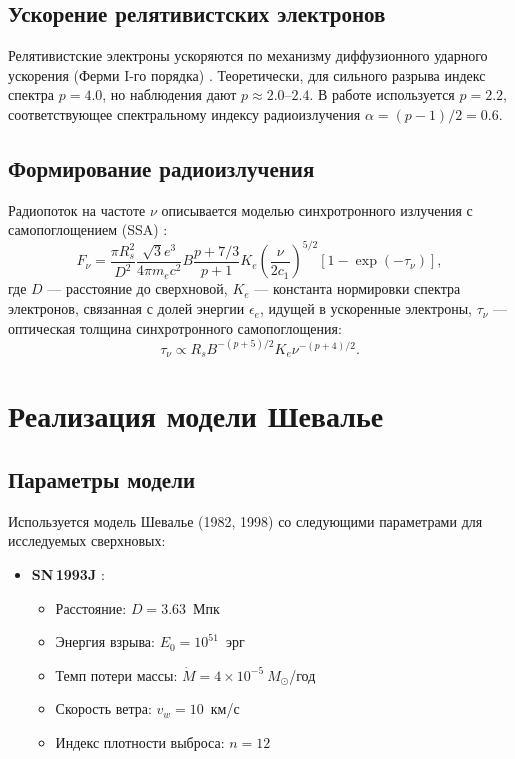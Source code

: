 \documentclass[a4paper,12pt]{extarticle}
\newcommand{\rs}{R_s}
\begin{document}
\subsection{Ускорение релятивистских электронов}

Релятивистские электроны ускоряются по механизму диффузионного ударного ускорения (Ферми I-го порядка) \cite{blandford1978}. Теоретически, для сильного разрыва индекс спектра $p = 4.0$, но наблюдения дают $p \approx 2.0$–$2.4$. В работе используется $p = 2.2$, соответствующее спектральному индексу радиоизлучения $\alpha = (p-1)/2 = 0.6$.

\subsection{Формирование радиоизлучения}

Радиопоток на частоте $\nu$ описывается моделью синхротронного излучения с самопоглощением (SSA) \cite{chevalier1998}:
\begin{equation}
    F_\nu = \frac{\pi \rs^2}{D^2} \frac{\sqrt{3} e^3}{4\pi m_e c^2} B \frac{p+7/3}{p+1} K_e \left( \frac{\nu}{2 c_1} \right)^{5/2} \left[ 1 - \exp\left( - \tau_\nu \right) \right], \label{eq:flux_general}
\end{equation}
где $D$ — расстояние до сверхновой, $K_e$ — константа нормировки спектра электронов, связанная с долей энергии $\epsilon_e$, идущей в ускоренные электроны, $\tau_\nu$ — оптическая толщина синхротронного самопоглощения:
\begin{equation}
    \tau_\nu \propto \rs B^{-(p+5)/2} K_e \nu^{-(p+4)/2}.
\end{equation}

\section{Реализация модели Шевалье}

\subsection{Параметры модели}

Используется модель Шевалье (1982, 1998) со следующими параметрами для исследуемых сверхновых:

\begin{itemize}
    \item \textbf{SN\,1993J} \cite{weiler1990, van_dyk1994}:
    \begin{itemize}
        \item Расстояние: $D = 3.63$~Мпк
        \item Энергия взрыва: $E_0 = 10^{51}$~эрг
        \item Темп потери массы: $\dot{M} = 4 \times 10^{-5}~M_\odot$/год
        \item Скорость ветра: $v_w = 10$~км/с
        \item Индекс плотности выброса: $n = 12$
    \end{itemize}

\end{itemize}
\end{document}
